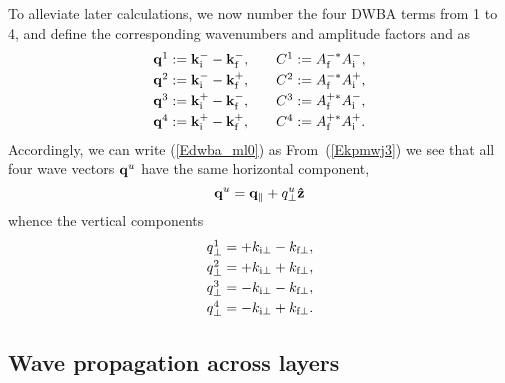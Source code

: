 To alleviate later calculations,
we now number the four DWBA terms from 1 to 4,
and define the corresponding wavenumbers and amplitude factors and as
\begin{equation}
  \begin{array}{l@{\hspace{2em}}l}
    \q^1 := \k^-_\ti - \k^-_\tf,& C^1 := A^{-*}_\tf A^-_\ti, \\[.6ex]
    \q^2 := \k^-_\ti - \k^+_\tf,& C^2 := A^{-*}_\tf A^+_\ti, \\[.6ex]
    \q^3 := \k^+_\ti - \k^-_\tf,& C^3 := A^{+*}_\tf A^-_\ti, \\[.6ex]
    \q^4 := \k^+_\ti - \k^+_\tf,& C^4 := A^{+*}_\tf A^+_\ti.
  \end{array}
\end{equation}
Accordingly, we can write (\ref{Edwba_ml0}) as
From~(\ref{Ekpmwj3}) we see that all four wave vectors $\mathbf{q}^u$
have the same horizontal component,
\begin{equation}\label{Eqpp}
  \mathbf{q}^u = \mathbf{q}_\parallel + q^u_\perp \mathbf{\hat z}
\end{equation}
whence the vertical components
\begin{equation}
    \begin{array}{l}
  q^1_\perp = +k_{\text{i}\perp  } -k_{\text{f}\perp},\\[.6ex]
  q^2_\perp = +k_{\text{i}\perp  } +k_{\text{f}\perp},\\[.6ex]
  q^3_\perp = -k_{\text{i}\perp  } -k_{\text{f}\perp},\\[.6ex]
  q^4_\perp = -k_{\text{i}\perp  } +k_{\text{f}\perp}.
    \end{array}
\end{equation}

\subsection{Wave propagation across layers}\label{Sacrolay}

%
%
%

